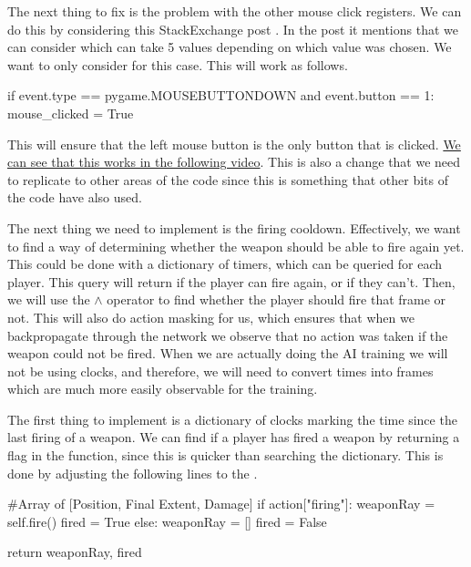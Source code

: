 The next thing to fix is the problem with the other mouse click registers. We can do this by considering this StackExchange post \cite{pygame_mouse_clicks}. In the post it mentions that we can consider  which can take 5 values depending on which value was chosen. We want to only consider  for this case. This will work as follows.

\begin{mpy}
                if event.type == pygame.MOUSEBUTTONDOWN and event.button == 1:
                    mouse_clicked = True
\end{mpy}

This will ensure that the left mouse button is the only button that is clicked. \href{https://youtu.be/FmqvJE9Qpc8}{We can see that this works in the following video}. This is also a change that we need to replicate to other areas of the code since this is something that other bits of the code have also used.

\vs
The next thing we need to implement is the firing cooldown. Effectively, we want to find a way of determining whether the weapon should be able to fire again yet. This could be done with a dictionary of timers, which can be queried for each player. This query will return  if the player can fire again, or  if they can't. Then, we will use the $\land$ operator to find whether the player should fire that frame or not. This will also do action masking for us, which ensures that when we backpropagate through the network we observe that no action was taken if the weapon could not be fired. When we are actually doing the AI training we will not be using clocks, and therefore, we will need to convert times into frames which are much more easily observable for the training.

\vs
The first thing to implement is a dictionary of clocks marking the time since the last firing of a weapon. We can find if a player has fired a weapon by returning a flag in the  function, since this is quicker than searching the dictionary. This is done by adjusting the following lines to the .

\begin{mpy}
        #Array of [Position, Final Extent, Damage]
        if action["firing"]:
            weaponRay = self.fire()
            fired = True
        else:
            weaponRay = []
            fired = False

        return weaponRay, fired
\end{mpy}

